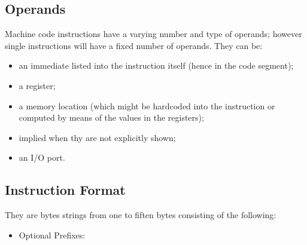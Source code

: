 \documentclass[paper=a4, fontsize=11pt]{report} %
\numberwithin{equation}{section} %
\numberwithin{figure}{section} %
\numberwithin{table}{section} %
\begin{document}
\subsection{Operands}
Machine code instructions have a varying number and type of operands; however single instructions will have a fixed number of operands. They can be:
\begin{itemize}
	\item an immediate listed into the instruction itself (hence in the code 							segment);
	\item a register;
	\item a memory location (which might be hardcoded into the instruction or 						computed by means of the values in the registers);
	\item implied when thy are not explicitly shown;
	\item an I/O port.
\end{itemize}
\subsection{Instruction Format}
They are bytes strings from one to fiften bytes consisting of the following:
\begin{itemize}
	\item Optional Prefixes: 
\end{itemize}
\glsaddall
\printglossaries
\end{document}
